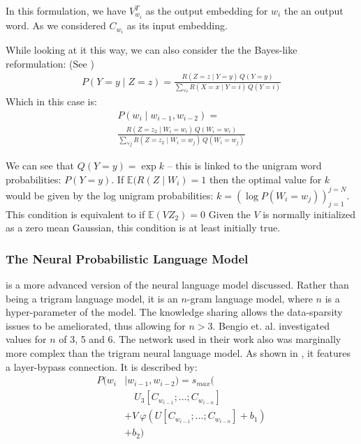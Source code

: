 \documentclass[parskip]{komatufte}
\begin{document}
In this formulation, we have $V_{w_{i}}^{T}$ as the output embedding for $w_{i}$ the an output word.
As we considered  $C_{w_{i}}$ as its input embedding.

While looking at it this way, we can also consider the the Bayes-like reformulation: (See )
\begin{multline}
P(Y=y\mid Z=z)=\frac{R(Z=z\mid Y=y)\,Q(Y=y)}{\sum_{\forall i}R(X=x\mid Y=i)\,Q(Y=i)}
\end{multline}
Which in this case is:
\begin{multline}
P(w_{i}\mid w_{i-1},w_{i-2})=\\
\frac{R(Z=z_{2}\mid W_{i}=w_{i})\,Q(W_{i}=w_{i})}{\sum_{\forall j}R(Z=z_{2}\mid W_{i}=w_{j})\,Q(W_{i}=w_{j})}
\end{multline}

We can see that $Q(Y=y)=\exp{k}$ -- this is linked to the unigram word probabilities: $P(Y=y)$.
If $\mathbb{E}(R(Z\mid W_{i})=1$ then the optimal value for $k$ would be given by the log unigram probabilities: $k=\left(\log P(W_{i}=w_{j})\right)_{j=1}^{j=N}$.
This condition is equivalent to if $\mathbb{E}(VZ_{2})=0$
Given the $V$ is normally initialized as a zero mean Gaussian, this condition is at least initially true.


\subsubsection{The Neural Probabilistic Language Model}
 is a more advanced version of the neural language model discussed.
Rather than being a trigram language model, it is an $n$-gram language model, where $n$ is a hyper-parameter of the model.
The knowledge sharing allows the data-sparsity issues to be ameliorated, thus allowing for $n>3$.
%
%
Bengio et. al. investigated values for $n$ of 3, 5 and 6.
The network used in their work also was marginally more complex than the trigram neural language model.
As shown in ,
it features a layer-bypass connection.
It is described by:
\begin{align}
P(w_i & \mid w_{i-1}, w_{i-2}) = s_{max}( \nonumber
\\  & \quad U_3 \left[ C_{w_{i-1}};...; C_{w_{i-n}}\right] \nonumber
\\  & + V \: \varphi\left( U\left[C_{w_{i-1}};...; C_{w_{i-n}} \right] + b_1\right) \nonumber
\\  & +b_2)
\end{align}
\end{document}
